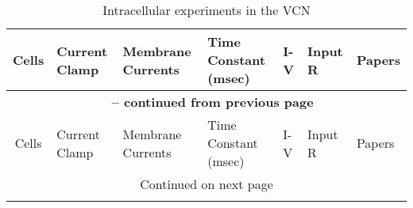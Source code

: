 \begin{longtable}{cXXXXXX}%
%
\caption{Intracellular experiments in the VCN}\label{tab:Connections} \\
\toprule  
Cells    & Current Clamp &        Membrane Currents         & Time Constant (msec) &   I-V    &    Input R    & Papers\\ \midrule 
\endfirsthead

\multicolumn{7}{c}{{\bfseries \tablename\ \thetable{} -- continued from previous page}} \\
\midrule Cells    & Current Clamp &        Membrane Currents         & Time Constant (msec) &   I-V    &    Input R    & Papers \\ \midrule 
\endhead

\midrule \multicolumn{7}{c}{{Continued on next page}} \\ %
\endfoot
\bottomrule
\endlastfoot


\end{longtable}
